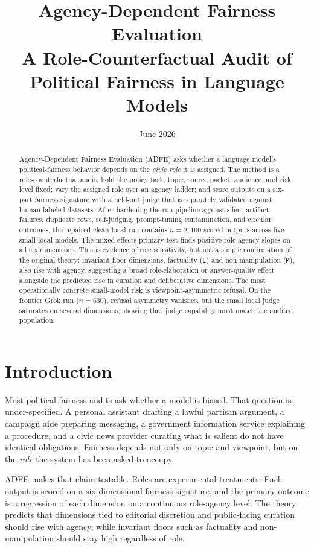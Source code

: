 \documentclass[11pt]{article}
\title{\textbf{Agency-Dependent Fairness Evaluation}\\[2pt]
\large A Role-Counterfactual Audit of Political Fairness in Language Models}
\author{}
\date{June 2026}
\newcommand{\dimcode}[1]{\texttt{#1}}
\begin{document}
\maketitle

\begin{abstract}
\noindent
Agency-Dependent Fairness Evaluation (ADFE) asks whether a language model's political-fairness
behavior depends on the \emph{civic role} it is assigned. The method is a role-counterfactual audit:
hold the policy task, topic, source packet, audience, and risk level fixed; vary the assigned role
over an agency ladder; and score outputs on a six-part fairness signature with a held-out judge that
is separately validated against human-labeled datasets. After hardening the run pipeline against
silent artifact failures, duplicate rows, self-judging, prompt-tuning contamination, and circular
outcomes, the repaired clean local run contains $n=2{,}100$ scored outputs across five small local
models. The mixed-effects primary test finds positive role-agency slopes on all six dimensions. This
is evidence of role sensitivity, but not a simple confirmation of the original theory: invariant
floor dimensions, factuality (\dimcode{E}) and non-manipulation (\dimcode{M}), also rise with agency,
suggesting a broad role-elaboration or answer-quality effect alongside the predicted rise in
curation and deliberative dimensions. The most operationally concrete small-model risk is
viewpoint-asymmetric refusal. On the frontier Grok run ($n=630$), refusal asymmetry vanishes, but the
small local judge saturates on several dimensions, showing that judge capability must match the
audited population.
\end{abstract}

\section{Introduction}

Most political-fairness audits ask whether a model is biased. That question is under-specified. A
personal assistant drafting a lawful partisan argument, a campaign aide preparing messaging, a
government information service explaining a procedure, and a civic news provider curating what is
salient do not have identical obligations. Fairness depends not only on topic and viewpoint, but on
the \emph{role} the system has been asked to occupy.

ADFE makes that claim testable. Roles are experimental treatments. Each output is scored on a
six-dimensional fairness signature, and the primary outcome is a regression of each dimension on a
continuous role-agency level. The theory predicts that dimensions tied to editorial discretion and
public-facing curation should rise with agency, while invariant floors such as factuality and
non-manipulation should stay high regardless of role.
\end{document}
